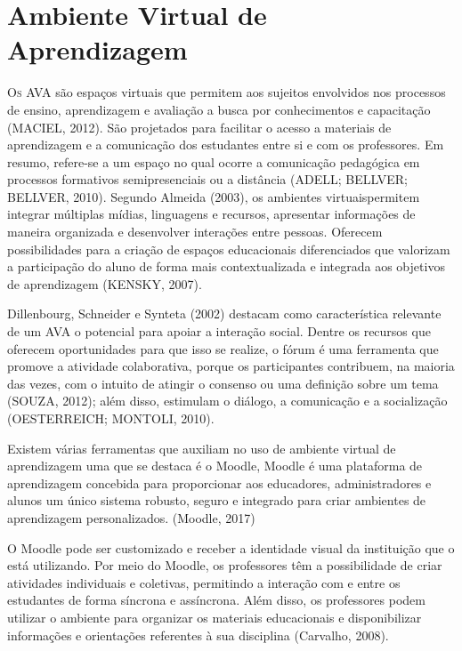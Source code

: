 \section{Ambiente Virtual de Aprendizagem}
\lettrine{O}{s} AVA são espaços virtuais que permitem aos sujeitos envolvidos nos processos de ensino, aprendizagem e avaliação a busca por conhecimentos e capacitação (MACIEL, 2012). São projetados para facilitar o acesso a materiais de aprendizagem e a comunicação dos estudantes entre si e com os professores. Em resumo, refere-se a um espaço no qual
ocorre a comunicação pedagógica em processos formativos semipresenciais ou a distância (ADELL; BELLVER; BELLVER, 2010). Segundo Almeida (2003), os ambientes virtuaispermitem integrar múltiplas mídias, linguagens e recursos, apresentar informações de maneira organizada e desenvolver interações entre pessoas. Oferecem possibilidades para
a criação de espaços educacionais diferenciados que valorizam a participação do aluno de forma mais contextualizada e integrada aos objetivos de aprendizagem (KENSKY, 2007). 

Dillenbourg, Schneider e Synteta (2002) destacam como característica relevante de um AVA o potencial para apoiar a interação social. Dentre os recursos que oferecem oportunidades para que isso se realize, o fórum é uma ferramenta que promove a atividade colaborativa, porque os participantes contribuem, na maioria das vezes, com o intuito de
atingir o consenso ou uma definição sobre um tema (SOUZA, 2012); além disso, estimulam o diálogo, a comunicação e a socialização (OESTERREICH; MONTOLI, 2010). 

Existem várias ferramentas que auxiliam no uso de ambiente virtual de aprendizagem uma que se destaca é o Moodle, Moodle é uma plataforma de aprendizagem concebida para proporcionar aos educadores, administradores e alunos um único sistema robusto, seguro e integrado para criar ambientes de aprendizagem personalizados. (Moodle, 2017)

O Moodle pode ser customizado e receber a identidade visual da instituição que o está utilizando. Por meio do Moodle, os professores têm a possibilidade de criar atividades individuais e coletivas, permitindo a interação com e entre os estudantes de forma síncrona e assíncrona. Além disso, os professores podem utilizar o ambiente para organizar os materiais educacionais e disponibilizar informações e orientações referentes à sua disciplina (Carvalho, 2008).

